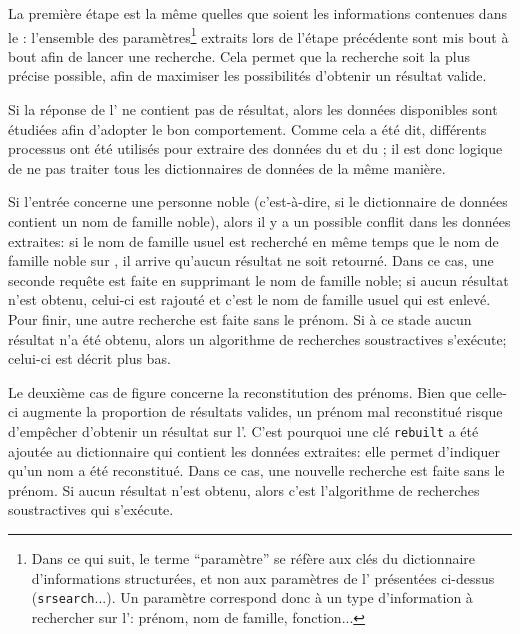 La première étape est la même quelles que soient les informations contenues dans le \tname{}: l'ensemble des paramètres\footnote{Dans ce qui suit, le terme \enquote{paramètre} se réfère aux clés du dictionnaire d'informations structurées, et non aux paramètres de l'\api{} présentées ci-dessus (\texttt{srsearch}...). Un paramètre correspond donc à un type d'information à rechercher sur l'\api{}: prénom, nom de famille, fonction...} extraits lors de l'étape précédente sont mis bout à bout afin de lancer une recherche. Cela permet que la recherche soit la plus précise possible, afin de maximiser les possibilités d'obtenir un résultat valide.

Si la réponse de l'\api{} ne contient pas de résultat, alors les données disponibles sont étudiées afin d'adopter le bon comportement. Comme cela a été dit, différents processus ont été utilisés pour extraire des données du \tname{} et du \ttrait{}; il est donc logique de ne pas traiter tous les \glspl{dictionnaire} de données de la même manière.

Si l'entrée concerne une personne noble (c'est-à-dire, si le dictionnaire de données contient un nom de famille noble), alors il y a un possible conflit dans les données extraites: si le nom de famille usuel est recherché en même temps que le nom de famille noble sur \wkd{}, il arrive qu'aucun résultat ne soit retourné. Dans ce cas, une seconde requête est faite en supprimant le nom de famille noble; si aucun résultat n'est obtenu, celui-ci est rajouté et c'est le nom de famille usuel qui est enlevé. Pour finir, une autre recherche est faite sans le prénom. Si à ce stade aucun résultat n'a été obtenu, alors un algorithme de recherches soustractives s'exécute; celui-ci est décrit plus bas.

Le deuxième cas de figure concerne la reconstitution des prénoms. Bien que celle-ci augmente la proportion de résultats valides, un prénom mal reconstitué risque d'empêcher d'obtenir un résultat sur l'\api{}. C'est pourquoi une clé \texttt{rebuilt} a été ajoutée au \gls{dictionnaire} qui contient les données extraites: elle permet d'indiquer qu'un nom a été reconstitué. Dans ce cas, une nouvelle recherche est faite sans le prénom. Si aucun résultat n'est obtenu, alors c'est l'algorithme de recherches soustractives qui s'exécute.

